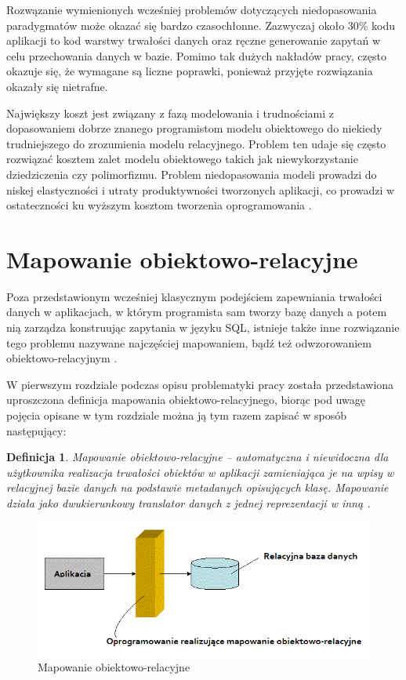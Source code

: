 \documentclass[12pt]{report}
\newtheorem{definition}{Definicja}
\begin{document}
Rozwązanie wymienionych wcześniej problemów dotyczących niedopasowania pa\-radygmatów może okazać się bardzo czasochłonne. Zazwyczaj około 30\% kodu aplikacji
to kod warstwy trwałości danych oraz ręczne generowanie zapytań w celu przechowania danych w bazie. Pomimo tak dużych nakładów pracy, często okazuje się, że
wymagane są liczne poprawki, ponieważ przyjęte rozwiązania okazały się nietrafne.

Największy koszt jest związany z fazą modelowania i trudnościami z dopasowaniem dobrze znanego programistom modelu obiektowego do niekiedy trudniejszego do zrozumienia
modelu relacyjnego. Problem ten udaje się często ro\-związać kosztem zalet modelu obiektowego takich jak niewykorzystanie dziedziczenia czy polimorfizmu. Problem niedopasowania
modeli prowadzi do niskej elastyczności i utraty produktywności tworzonych aplikacji, co prowadzi w ostateczności ku wyższym kosztom tworzenia oprogramowania \cite{hibernate}. 

\section{Mapowanie obiektowo-relacyjne}

Poza przedstawionym wcześniej klasycznym podejściem zapewniania trwałości da\-nych w aplikacjach, w którym programista sam tworzy bazę danych a potem nią zarządza
konstruując zapytania w języku SQL, istnieje także inne rozwiązanie tego problemu nazywane najczęściej mapowaniem, bądź też odwzorowaniem obiektowo-relacyjnym 
\cite{hibernate}.

W pierwszym rozdziale podczas opisu problematyki pracy została przedstawiona uproszczona definicja mapowania obiektowo-relacyjnego, biorąc pod uwagę pojęcia opisane
w tym rozdziale można ją tym razem zapisać w sposób następujący:

\begin{definition}
Mapowanie obiektowo-relacyjne --  automatyczna i niewidoczna dla uży\-tkownika realizacja trwałości obiektów w aplikacji zamieniająca je na wpisy w relacyjnej bazie danych
na podstawie metadanych opisujących klasę. Mapowanie działa jako dwukierunkowy translator danych z jednej reprezentacji w inną \cite{hibernate}. 
\end{definition}

\begin{figure}[h]
\centering
\includegraphics[width=.9\textwidth]{resources/orm.png}
\caption{Mapowanie obiektowo-relacyjne}
\end{figure}
\end{document}
